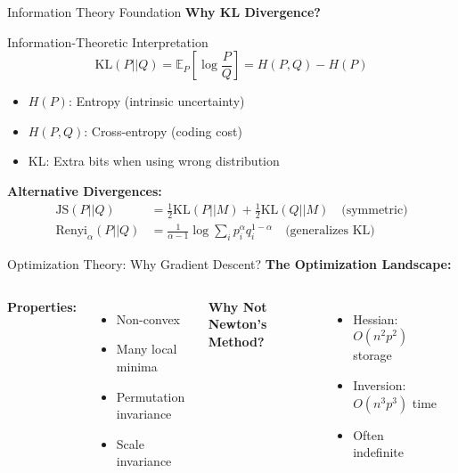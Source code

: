 \begin{frame}{Information Theory Foundation}
\textbf{Why KL Divergence?}

\begin{block}{Information-Theoretic Interpretation}
$$\text{KL}(P||Q) = \mathbb{E}_P\left[\log \frac{P}{Q}\right] = H(P,Q) - H(P)$$
\end{block}

\begin{itemize}
\item $H(P)$: Entropy (intrinsic uncertainty)
\item $H(P,Q)$: Cross-entropy (coding cost)
\item KL: Extra bits when using wrong distribution
\end{itemize}

\textbf{Alternative Divergences:}
\begin{align*}
\text{JS}(P||Q) &= \frac{1}{2}\text{KL}(P||M) + \frac{1}{2}\text{KL}(Q||M) \quad \text{(symmetric)}\\
\text{Renyi}_\alpha(P||Q) &= \frac{1}{\alpha-1}\log\sum_i p_i^\alpha q_i^{1-\alpha} \quad \text{(generalizes KL)}
\end{align*}

\end{frame}

\begin{frame}{Optimization Theory: Why Gradient Descent?}
\textbf{The Optimization Landscape:}

\begin{columns}
\textbf{Properties:}
\begin{itemize}
\item Non-convex
\item Many local minima
\item Permutation invariance
\item Scale invariance
\end{itemize}

\textbf{Why Not Newton's Method?}
\begin{itemize}
\item Hessian: $O(n^2p^2)$ storage
\item Inversion: $O(n^3p^3)$ time
\item Often indefinite
\end{itemize}

\begin{center}
\end{center}
\end{columns}

\end{frame}

